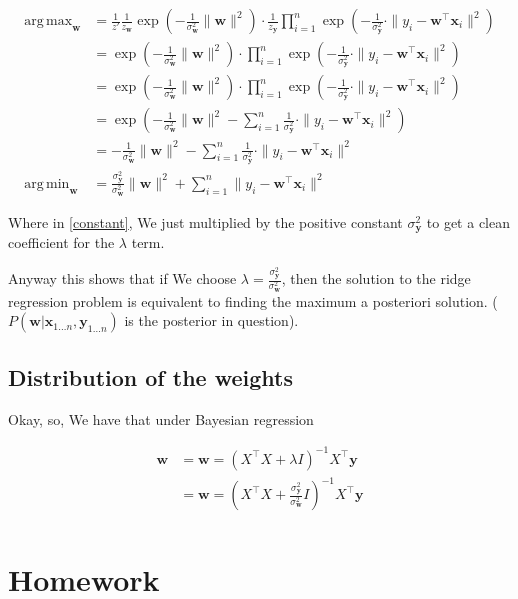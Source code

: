 \documentclass{article}
\DeclareMathOperator*{\argmax}{arg\,max}
\DeclareMathOperator*{\argmin}{arg\,min}
\begin{document}
		\begin{align}
			\argmax_{\mathbf{w}} &= \frac{1}{z'} \frac{1}{z_{\mathbf{w}}}\exp\left(-\frac{1}{\sigma^2_{\mathbf{w}}}\|\mathbf{w}\|^2 \right) \cdot \frac{1}{z_{\mathbf{y}}}\prod^n_{i=1}\exp\left(-\frac{1}{\sigma^2_{\mathbf{y}}}\cdot\|y_i - \mathbf{w}^\top\mathbf{x}_i \|^2\right)\\
			&= \exp\left(-\frac{1}{\sigma^2_{\mathbf{w}}}\|\mathbf{w}\|^2 \right) \cdot \prod^n_{i=1}\exp\left(-\frac{1}{\sigma^2_{\mathbf{y}}}\cdot\|y_i - \mathbf{w}^\top\mathbf{x}_i \|^2\right)\\
			&= \exp\left(-\frac{1}{\sigma^2_{\mathbf{w}}}\|\mathbf{w}\|^2 \right) \cdot \prod^n_{i=1}\exp\left(-\frac{1}{\sigma^2_{\mathbf{y}}}\cdot\|y_i - \mathbf{w}^\top\mathbf{x}_i \|^2\right)\\
			&= \exp\left(-\frac{1}{\sigma^2_{\mathbf{w}}}\|\mathbf{w}\|^2  - \sum^n_{i=1} \frac{1}{\sigma^2_{\mathbf{y}}}\cdot\|y_i - \mathbf{w}^\top\mathbf{x}_i \|^2\right)\\
			&= -\frac{1}{\sigma^2_{\mathbf{w}}}\|\mathbf{w}\|^2  - \sum^n_{i=1} \frac{1}{\sigma^2_{\mathbf{y}}}\cdot\|y_i - \mathbf{w}^\top\mathbf{x}_i \|^2\label{constant}\\
			\argmin_{\mathbf{w}}&= \frac{\sigma^2_{\mathbf{y}}}{\sigma^2_{\mathbf{w}}}\|\mathbf{w}\|^2  + \sum^n_{i=1} \|y_i - \mathbf{w}^\top\mathbf{x}_i \|^2\
		\end{align}
		
		Where in \ref{constant}, We just multiplied by the positive constant $\sigma^2_{\mathbf{y}}$ to get a clean coefficient for the $\lambda$ term.
		
		Anyway this shows that if We choose $\lambda=\frac{\sigma^2_{\mathbf{y}}}{\sigma^2_{\mathbf{w}}}$, then the solution to the ridge regression problem is equivalent to finding the maximum a posteriori solution. ($P(\mathbf{w}|\mathbf{x}_{1\ldots n}, \mathbf{y}_{1\ldots n})$ is the posterior in question).
		
	\subsection{Distribution of the weights}
	
		Okay, so, We have that under Bayesian regression
		
		\begin{align}
			\mathbf{w} &= \mathbf{w} = (X^\top X + \lambda I)^{-1}X^\top \mathbf{y}\\
			&= \mathbf{w} = (X^\top X + \frac{\sigma^2_{\mathbf{y}}}{\sigma^2_{\mathbf{w}}} I)^{-1}X^\top \mathbf{y}\\
		\end{align}
		
\newpage

\section{Homework}

	
			
\end{document}
